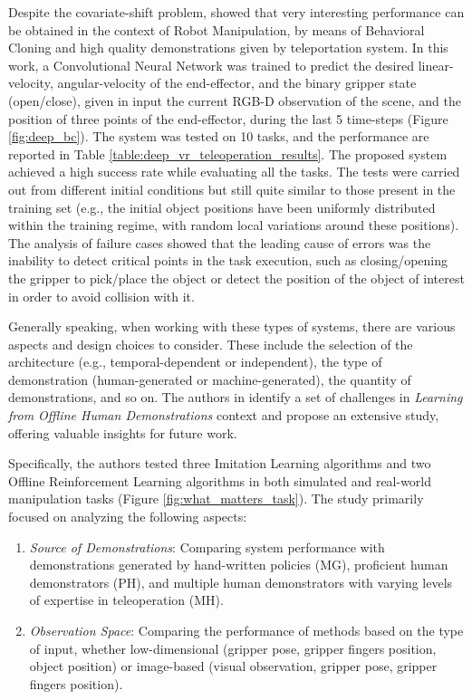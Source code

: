 Despite the covariate-shift problem, \cite{zhang2018deep_vr_teleoperation} showed that very interesting performance can be obtained in the context of Robot Manipulation, by means of Behavioral Cloning and high quality demonstrations given by teleportation system. In this work, a Convolutional Neural Network was trained to predict the desired linear-velocity, angular-velocity of the end-effector, and the binary gripper state (open/close), given in input the current RGB-D observation of the scene, and the position of three points of the end-effector, during the last 5 time-steps (Figure \ref{fig:deep_bc}). The system was tested on 10 tasks, and the performance are reported in Table \ref{table:deep_vr_teleoperation_results}. The proposed system achieved a high success rate while evaluating all the tasks. The tests were carried out from different initial conditions but still quite similar to those present in the training set (e.g., the initial object positions have been uniformly distributed within the training regime, with random local variations around these positions). The analysis of failure cases showed that the leading cause of errors was the inability to detect critical points in the task execution, such as closing/opening the gripper to pick/place the object or detect the position of the object of interest in order to avoid collision with it.


Generally speaking, when working with these types of systems, there are various aspects and design choices to consider. These include the selection of the architecture (e.g., temporal-dependent or independent), the type of demonstration (human-generated or machine-generated), the quantity of demonstrations, and so on. The authors in \cite{mandlekar2022matters} identify a set of challenges in \textit{Learning from Offline Human Demonstrations} context and propose an extensive study, offering valuable insights for future work.

Specifically, the authors tested three Imitation Learning algorithms and two Offline Reinforcement Learning algorithms in both simulated and real-world manipulation tasks (Figure \ref{fig:what_matters_task}). The study primarily focused on analyzing the following aspects:

\begin{enumerate}
    \item \textit{Source of Demonstrations}: Comparing system performance with demonstrations generated by hand-written policies (MG), proficient human demonstrators (PH), and multiple human demonstrators with varying levels of expertise in teleoperation (MH).
    \item \textit{Observation Space}: Comparing the performance of methods based on the type of input, whether low-dimensional (gripper pose, gripper fingers position, object position) or image-based (visual observation, gripper pose, gripper fingers position).
\end{enumerate}


